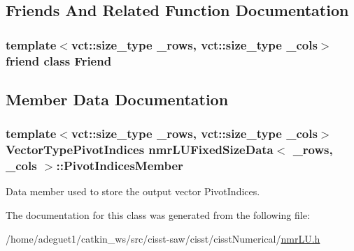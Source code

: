 \subsection{Friends And Related Function Documentation}
\hypertarget{classnmr_l_u_fixed_size_data_a7f8321d57e81bc613d5dbef3410ba70e}{
\subsubsection[{Friend}]{\setlength{\rightskip}{0pt plus 5cm}template$<$vct\-::size\-\_\-type \-\_\-rows, vct\-::size\-\_\-type \-\_\-cols$>$ friend class {\bf Friend}\hspace{0.3cm}{\ttfamily [friend]}}}\label{classnmr_l_u_fixed_size_data_a7f8321d57e81bc613d5dbef3410ba70e}


\subsection{Member Data Documentation}
\hypertarget{classnmr_l_u_fixed_size_data_afcd875504a4471fe5f0997ca8de617ad}{
\subsubsection[{Pivot\-Indices\-Member}]{\setlength{\rightskip}{0pt plus 5cm}template$<$vct\-::size\-\_\-type \-\_\-rows, vct\-::size\-\_\-type \-\_\-cols$>$ {\bf Vector\-Type\-Pivot\-Indices} {\bf nmr\-L\-U\-Fixed\-Size\-Data}$<$ \-\_\-rows, \-\_\-cols $>$\-::Pivot\-Indices\-Member\hspace{0.3cm}{\ttfamily [protected]}}}\label{classnmr_l_u_fixed_size_data_afcd875504a4471fe5f0997ca8de617ad}
Data member used to store the output vector Pivot\-Indices. 

The documentation for this class was generated from the following file\-:\begin{DoxyCompactItemize}
\item 
/home/adeguet1/catkin\-\_\-ws/src/cisst-\/saw/cisst/cisst\-Numerical/\hyperlink{nmr_l_u_8h}{nmr\-L\-U.\-h}\end{DoxyCompactItemize}
